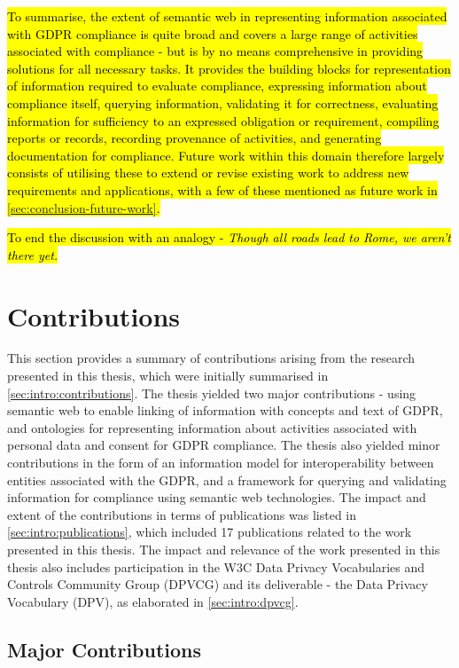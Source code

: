 \hl{To summarise, the extent of semantic web in representing information associated with GDPR compliance is quite broad and covers a large range of activities associated with compliance - but is by no means comprehensive in providing solutions for all necessary tasks.
It provides the building blocks for representation of information required to evaluate compliance, expressing information about compliance itself, querying information, validating it for correctness, evaluating information for sufficiency to an expressed obligation or requirement, compiling reports or records, recording provenance of activities, and generating documentation for compliance.
Future work within this domain therefore largely consists of utilising these to extend or revise existing work to address new requirements and applications, with a few of these mentioned as future work in \autoref{sec:conclusion-future-work}.}

\hl{To end the discussion with an analogy - \textit{Though all roads lead to Rome, we aren't there yet.}}

\section{Contributions}\label{sec:conclusion-contributions}
This section provides a summary of contributions arising from the research presented in this thesis, which were initially summarised in \autoref{sec:intro:contributions}.
The thesis yielded two major contributions - using semantic web to enable linking of information with concepts and text of GDPR, and ontologies for representing information about activities associated with personal data and consent for GDPR compliance. The thesis also yielded minor contributions in the form of an information model for interoperability between entities associated with the GDPR, and a framework for querying and validating information for compliance using semantic web technologies.
The impact and extent of the contributions in terms of publications was listed in \autoref{sec:intro:publications}, which included 17 publications related to the work presented in this thesis.
The impact and relevance of the work presented in this thesis also includes participation in the W3C Data Privacy Vocabularies and Controls Community Group (DPVCG) and its deliverable - the Data Privacy Vocabulary (DPV), as elaborated in \autoref{sec:intro:dpvcg}.

\subsection*{Major Contributions}
